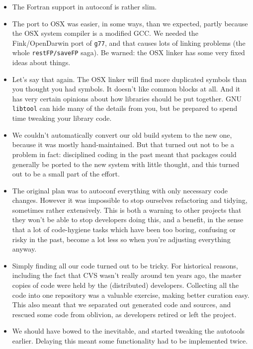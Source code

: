\documentclass[11pt,twoside]{article}
\begin{document}
\begin{itemize}
\item The Fortran support in autoconf is rather slim.

\item The port to OSX was easier, in some ways, than we expected,
  partly because the OSX system compiler is a modified GCC.  We needed
  the Fink/OpenDarwin port of \texttt{g77}, and that causes lots of
  linking problems (the whole \texttt{restFP/saveFP} saga).  Be
  warned: the OSX linker has some very fixed ideas about things.

\item Let's say that again.  The OSX linker will find more duplicated
  symbols than you thought you had symbols.  It doesn't like common
  blocks at all.  And it has very certain opinions about how libraries
  should be put together.  GNU \texttt{libtool} can hide many of the
  details from you, but be prepared to spend time tweaking your library code.

\item We couldn't automatically convert our old build system to the
  new one, because it was mostly hand-maintained.  But that turned out
  not to be a problem in fact: disciplined coding in the past meant
  that packages could
  generally be ported to the new system with little thought, and this
  turned out to be a small part of the effort.

\item The original plan was to autoconf everything with only necessary
  code changes.  However it was impossible to stop ourselves
  refactoring and tidying, sometimes rather extensively.  This is
  both a warning to other projects that they won't be able to stop
  developers doing this, and a benefit, in the sense that a lot of
  code-hygiene tasks which have been too boring, confusing or risky in
  the past, become a lot less so when you're adjusting everything
  anyway.

\item Simply finding all our code turned out to be tricky.  For
  historical reasons, including the fact that CVS wasn't really around
  ten years ago, the master copies of code were held by the
  (distributed) developers.  Collecting all the code into one
  repository was a valuable exercise, making better curation easy.
  This also meant that we separated out generated code and sources, and
  rescued some code from oblivion, as developers retired or left the
  project.

\item We should have bowed to the inevitable, and started tweaking the
  autotools earlier.  Delaying this meant some functionality had to be
  implemented twice.


\end{itemize}
\end{document}
